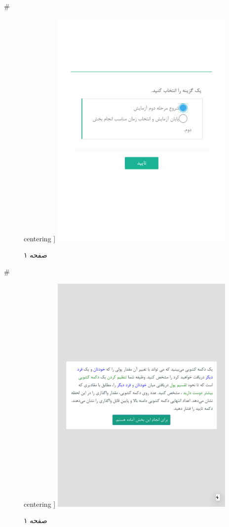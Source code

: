 { 
 # 
\begin{figure}[htpb]
centering ]
\includegraphics[width=0.8\textwidth]{./img/Task40.png/}
\caption{صفحه ۱}
\label{fig:Task1}
\end{figure}
 
 
 # 
\begin{figure}[htpb]
centering ]
\includegraphics[width=0.8\textwidth]{./img/Task41.png/}
\caption{صفحه ۱}
\label{fig:Task1}
\end{figure}
 
}

